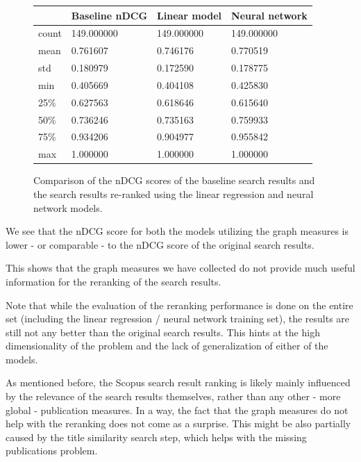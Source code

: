 \begin{figure}[!ht]
    \centering
    \begin{tabular}{|l|l|l|l|}
    \hline
        ~ & \textbf{Baseline nDCG} & \textbf{Linear model} & \textbf{Neural network} \\ \hline
        count & 149.000000 & 149.000000 & 149.000000 \\ \hline
        mean & 0.761607 & 0.746176 & 0.770519 \\ \hline
        std & 0.180979 & 0.172590 & 0.178775 \\ \hline
        min & 0.405669 & 0.404108 & 0.425830 \\ \hline
        25\% & 0.627563 & 0.618646 & 0.615640 \\ \hline
        50\% & 0.736246 & 0.735163 & 0.759933 \\ \hline
        75\% & 0.934206 & 0.904977 & 0.955842 \\ \hline
        max & 1.000000 & 1.000000 & 1.000000 \\ \hline
    \end{tabular}
    \captionsetup{width=.9\linewidth}
    \caption{Comparison of the nDCG scores of the baseline search results and the search results re-ranked using the linear regression and neural network models.}
\end{figure}

We see that the nDCG score for both the models utilizing the graph measures is lower - or comparable - 
to the nDCG score of the original search results.

This shows that the graph measures we have collected do not provide much useful information 
for the reranking of the search results. 

Note that while the evaluation of the reranking performance is done on the entire set 
(including the linear regression / neural network training set), 
the results are still not any better than the original search results. 
This hints at the high dimensionality of the problem and the lack of generalization of either of the models.

As mentioned before, the Scopus search result ranking is likely mainly influenced by the relevance of 
the search results themselves, rather than any other - more global - publication measures. 
In a way, the fact that the graph measures do not help with the reranking does not come as a surprise. 
This might be also partially caused by the title similarity search step, which helps with the missing publications problem.

